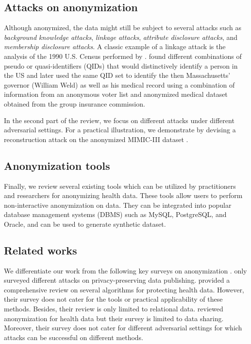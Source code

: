 \documentclass{bioinfo}
\begin{document}
\subsection{Attacks on anonymization}
Although anonymized, the data might still be subject to several attacks such as \emph{background knowledge attacks}, \emph{linkage attacks}, \emph{attribute disclosure attacks}, and \emph{membership disclosure attacks}. A classic example of a linkage attack is the analysis of the 1990 U.S. Census performed by \citet{sweeney2000simple}. \citet{sweeney2000simple} found different combinations of pseudo or quasi-identifiers (QIDs) that would distinctively identify a person in the US and later used the same QID set to identify the then Massachusetts' governor (William Weld) as well as his medical record using a combination of information from an anonymous voter list and anonymized medical dataset obtained from the group insurance commission.

In the second part of the review, we focus on different attacks under different adversarial settings. For a practical illustration, we demonstrate by devising a reconstruction attack on the anonymized MIMIC-III dataset \cite{johnson2016mimic}. 

\subsection{Anonymization tools}
Finally, we review several existing tools which can be utilized by practitioners and researchers for anonymizing health data. 
These tools allow users to perform non-interactive anonymization on data. They can be integrated into popular database management systems (DBMS) such as MySQL, PostgreSQL, and Oracle, and can be used to generate synthetic dataset.


\subsection{Related works}
We differentiate our work from the following key surveys on anonymization \cite{hamza2013attacks, cite729gkoulalas2014publishing, cite7eze2015systematic, majeed2020anonymization}.
\citet{hamza2013attacks} only surveyed different attacks on privacy-preserving data publishing. \citet{cite729gkoulalas2014publishing} provided a comprehensive review on several algorithms for protecting health data. However, their survey does not cater for the tools or practical applicability of these methods. Besides, their review is only limited to relational data. \citet{cite7eze2015systematic} reviewed anonymization for health data but their survey is limited to data sharing. Moreover, their survey does not cater for different adversarial settings for which attacks can be successful on different methods.
\end{document}
